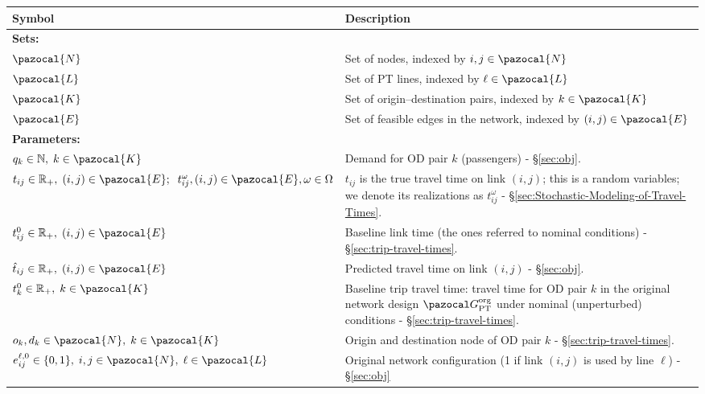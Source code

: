 \documentclass[a4paper,fleqn]{cas-sc}
\begin{document}
\begin{table}
\centering
\renewcommand{\arraystretch}{0.95} %
\setlength{\tabcolsep}{5pt} %
\footnotesize %
\begin{tabular}{p{} p{}}
\toprule
Symbol & Description \\
\midrule
\multicolumn{2}{l}{\textbf{Sets:}} \\
\midrule
$\pazocal{N}$ & Set of nodes, indexed by $i,j \in \pazocal{N}$ \\
$\pazocal{L}$ & Set of PT lines, indexed by $\ell \in \pazocal{L}$ \\
$\pazocal{K}$ & Set of origin–destination pairs, indexed by $k \in \pazocal{K}$ \\
$\pazocal{E}$ & Set of feasible edges in the network, indexed by $(i,j) \in \pazocal{E}$ \\
\midrule
\multicolumn{2}{l}{\textbf{Parameters:}} \\
\midrule
$q_k \in \mathbb{N},\; k \in \pazocal{K}$ & Demand for OD pair $k$ (passengers) - \S\ref{sec:obj}.
\\
$t_{ij} \in \mathbb{R}_{+},\; (i,j) \in \pazocal{E}; \;\; t_{ij}^\omega, (i,j) \in \pazocal{E}, \omega\in\Omega$
& $t_{ij}$ is the true travel time on link $(i,j)$; this is a random variables; we denote its realizations as $t_{ij}^\omega$ - \S\ref{sec:Stochastic-Modeling-of-Travel-Times}. 
\\
$t_{ij}^0 \in \mathbb{R}_{+},\; (i,j) \in \pazocal{E}$ 
& Baseline link time (the ones referred to nominal conditions) - \S\ref{sec:trip-travel-times}. 
\\
$\hat{t}_{ij} \in \mathbb{R}_{+},\; (i,j) \in \pazocal{E}$ 
& Predicted travel time on link $(i,j)$ - \S\ref{sec:obj}.  
\\
$t_k^0 \in \mathbb{R}_{+},\; k \in \pazocal{K}$ 
& Baseline trip travel time: travel time for OD pair $k$ in the original network design $\pazocal G_\text{PT}^\text{org}$ under nominal (unperturbed) conditions - \S\ref{sec:trip-travel-times}.\\
$o_k, d_k \in \pazocal{N},\; k \in \pazocal{K}$ & Origin and destination node of OD pair $k$ - \S\ref{sec:trip-travel-times}. \\
$e_{ij}^{\ell, 0} \in \{0,1\},\; i,j \in \pazocal{N},\; \ell \in \pazocal{L}$ & Original network configuration (1 if link $(i,j)$ is used by line $\ell$) - \S\ref{sec:obj} \\

\end{tabular}
\end{table}
\end{document}
